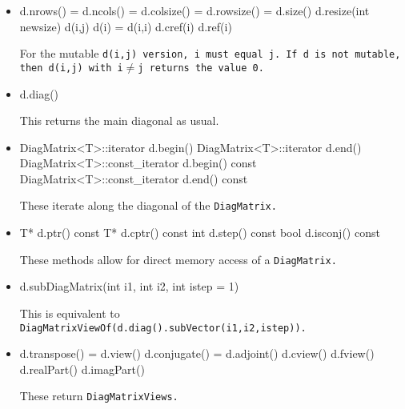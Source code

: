 \begin{itemize}

\item
\begin{tmvcode}
d.nrows() = d.ncols() = d.colsize() = d.rowsize() = d.size()
d.resize(int newsize)
d(i,j)
d(i) = d(i,i)
d.cref(i)
d.ref(i)
\end{tmvcode}
For the mutable \tt{d(i,j)} version, \tt{i} must equal \tt{j}.
If \tt{d} is not mutable, then \tt{d(i,j)} with \tt{i}$\neq$\tt{j} returns the 
value 0.

\item
\begin{tmvcode}
d.diag()
\end{tmvcode}
This returns the main diagonal as usual.

\item
\begin{tmvcode}
DiagMatrix<T>::iterator d.begin()
DiagMatrix<T>::iterator d.end()
DiagMatrix<T>::const_iterator d.begin() const
DiagMatrix<T>::const_iterator d.end() const
\end{tmvcode}
These iterate along the diagonal of the \tt{DiagMatrix}.

\item
\begin{tmvcode}
T* d.ptr()
const T* d.cptr() const
int d.step() const
bool d.isconj() const
\end{tmvcode}
These methods allow for direct memory access of a \tt{DiagMatrix}.

\item
\begin{tmvcode}
d.subDiagMatrix(int i1, int i2, int istep = 1)
\end{tmvcode}
This is equivalent to \tt{DiagMatrixViewOf(d.diag().subVector(i1,i2,istep))}.

\item
\begin{tmvcode}
d.transpose() = d.view()
d.conjugate() = d.adjoint()
d.cview()
d.fview()
d.realPart()
d.imagPart()
\end{tmvcode}
These return \tt{DiagMatrixView}s.

\end{itemize}

